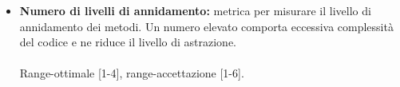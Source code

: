 \begin{itemize}
				\item \textbf{Numero di livelli di annidamento:} metrica per misurare il livello di annidamento dei metodi. Un numero elevato comporta eccessiva complessità del codice e ne riduce il livello di astrazione.\\ \\
				Range-ottimale [1-4], range-accettazione [1-6].
			\end{itemize}

	\pagebreak
